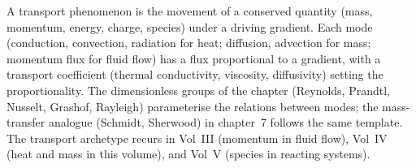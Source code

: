 \begin{archetype}[Transport]
A transport phenomenon is the movement of a conserved quantity (mass,
momentum, energy, charge, species) under a driving gradient. Each
mode (conduction, convection, radiation for heat; diffusion,
advection for mass; momentum flux for fluid flow) has a flux
proportional to a gradient, with a transport coefficient (thermal
conductivity, viscosity, diffusivity) setting the proportionality.
The dimensionless groups of the chapter (Reynolds, Prandtl, Nusselt,
Grashof, Rayleigh) parameterise the relations between modes; the
mass-transfer analogue (Schmidt, Sherwood) in chapter~7 follows the
same template. The transport archetype recurs in Vol~III (momentum
in fluid flow), Vol~IV (heat and mass in this volume), and Vol~V
(species in reacting systems).
\end{archetype}

